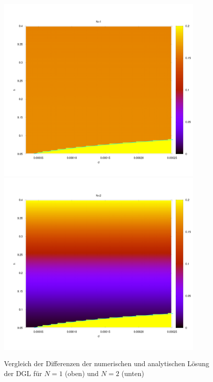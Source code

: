 \documentclass[ngerman]{scrartcl}
\begin{document}
\begin{figure}[htbp]
	\centering
	\includegraphics[width=0.9\textwidth]{heatMapN1}
	\includegraphics[width=0.9\textwidth]{heatMapN2}
	\caption[Vergleich]{Vergleich der Differenzen der numerischen und analytischen Lösung der DGL für $N=1$ (oben) und $N=2$ (unten)}
	\label{fig:H10.2}
\end{figure}
\subsection{}
\end{document}
